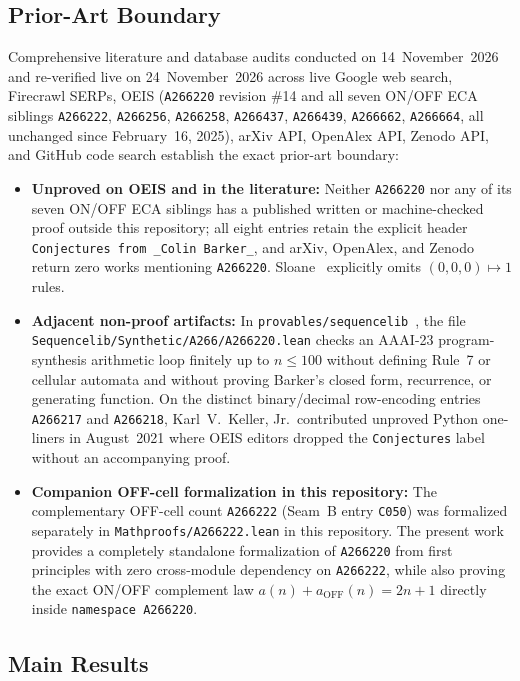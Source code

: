 \documentclass[11pt]{article}
\theoremstyle{definition}
\newcommand{\seq}[1]{\texttt{#1}}
\begin{document}
\subsection{Prior-Art Boundary}

Comprehensive literature and database audits conducted on 14~November~2026 and re-verified live on 24~November~2026 across live Google web search, Firecrawl SERPs, OEIS (\seq{A266220} revision \#14 and all seven ON/OFF ECA siblings \seq{A266222}, \seq{A266256}, \seq{A266258}, \seq{A266437}, \seq{A266439}, \seq{A266662}, \seq{A266664}, all unchanged since February~16, 2025), arXiv API, OpenAlex API, Zenodo API, and GitHub code search establish the exact prior-art boundary:
\begin{itemize}
\item \textbf{Unproved on OEIS and in the literature:} Neither \seq{A266220} nor any of its seven ON/OFF ECA siblings has a published written or machine-checked proof outside this repository; all eight entries retain the explicit header \texttt{Conjectures from \_Colin Barker\_}, and arXiv, OpenAlex, and Zenodo return zero works mentioning \seq{A266220}. Sloane~\cite{sloane2015} explicitly omits $(0, 0, 0) \mapsto 1$ rules.
\item \textbf{Adjacent non-proof artifacts:} In \texttt{provables/sequencelib}~\cite{sequencelib}, the file \nolinkurl{Sequencelib/Synthetic/A266/A266220.lean} checks an AAAI-23 program-synthesis arithmetic loop finitely up to $n \le 100$ without defining Rule~7 or cellular automata and without proving Barker's closed form, recurrence, or generating function. On the distinct binary/decimal row-encoding entries \seq{A266217} and \seq{A266218}, Karl~V.\ Keller, Jr.\ contributed unproved Python one-liners in August~2021 where OEIS editors dropped the \texttt{Conjectures} label without an accompanying proof.
\item \textbf{Companion OFF-cell formalization in this repository:} The complementary OFF-cell count \seq{A266222} (Seam~B entry \texttt{C050}) was formalized separately in \texttt{Mathproofs/A266222.lean} in this repository. The present work provides a completely standalone formalization of \seq{A266220} from first principles with zero cross-module dependency on \texttt{A266222}, while also proving the exact ON/OFF complement law $a(n) + a_{\mathrm{OFF}}(n) = 2n + 1$ directly inside \texttt{namespace A266220}.
\end{itemize}

\subsection{Main Results}
\end{document}
